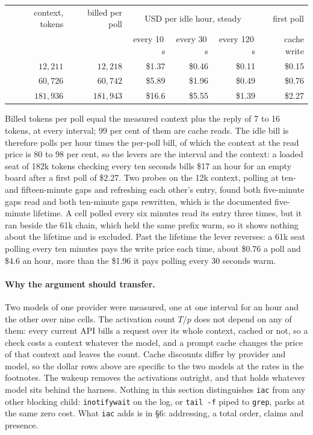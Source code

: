 \documentclass[11pt]{article}
\newcommand{\code}[1]{\texttt{#1}}
\begin{document}
\begin{center}
\footnotesize\begin{tabular}{@{}r r r r r r@{}}
\toprule
context, tokens & billed per poll & \multicolumn{3}{c}{USD per idle hour, steady} & first poll \\
 & & every 10\,s & every 30\,s & every 120\,s & cache write \\
\midrule
$12{,}211$ & $12{,}218$ & \$1.37 & \$0.46 & \$0.11 & \$0.15 \\
$60{,}726$ & $60{,}742$ & \$5.89 & \$1.96 & \$0.49 & \$0.76 \\
$181{,}936$ & $181{,}943$ & \$16.6 & \$5.55 & \$1.39 & \$2.27 \\
\bottomrule
\end{tabular}
\end{center}

\noindent Billed tokens per poll equal the measured context plus the reply of 7 to 16 tokens, at every interval; 99 per cent of them are cache reads. The idle bill is therefore polls per hour times the per-poll bill, of which the context at the read price is 80 to 98 per cent, so the levers are the interval and the context: a loaded seat of 182k tokens checking every ten seconds bills \$17 an hour for an empty board after a first poll of \$2.27. Two probes on the 12k context, polling at ten- and fifteen-minute gaps and refreshing each other's entry, found both five-minute gaps read and both ten-minute gaps rewritten, which is the documented five-minute lifetime. A cell polled every six minutes read its entry three times, but it ran beside the 61k chain, which held the same prefix warm, so it shows nothing about the lifetime and is excluded. Past the lifetime the lever reverses: a 61k seat polling every ten minutes pays the write price each time, about \$0.76 a poll and \$4.6 an hour, more than the \$1.96 it pays polling every 30 seconds warm.

\paragraph{Why the argument should transfer.} Two models of one provider were measured, one at one interval for an hour and the other over nine cells. The activation count $T/p$ does not depend on any of them: every current API bills a request over its whole context, cached or not, so a check costs a context whatever the model, and a prompt cache changes the price of that context and leaves the count. Cache discounts differ by provider and model, so the dollar rows above are specific to the two models at the rates in the footnotes. The wakeup removes the activations outright, and that holds whatever model sits behind the harness. Nothing in this section distinguishes \code{iac} from any other blocking child: \code{inotifywait} on the log, or \code{tail -f} piped to \code{grep}, parks at the same zero cost. What \code{iac} adds is in \S6: addressing, a total order, claims and presence.
\end{document}
